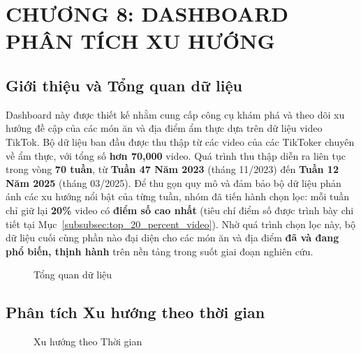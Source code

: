 \section{CHƯƠNG 8: DASHBOARD PHÂN TÍCH XU HƯỚNG}

\subsection{Giới thiệu và Tổng quan dữ liệu}

Dashboard này được thiết kế nhằm cung cấp công cụ khám phá và theo dõi xu hướng đề cập của các món ăn và địa điểm ẩm thực dựa trên dữ liệu video TikTok. Bộ dữ liệu ban đầu được thu thập từ các video của các TikToker chuyên về ẩm thực, với tổng số \textbf{hơn 70,000} video. Quá trình thu thập diễn ra liên tục trong vòng \textbf{70 tuần}, từ \textbf{Tuần 47 Năm 2023} (tháng 11/2023) đến \textbf{Tuần 12 Năm 2025} (tháng 03/2025). Để thu gọn quy mô và đảm bảo bộ dữ liệu phản ánh các xu hướng nổi bật của từng tuần, nhóm đã tiến hành chọn lọc: mỗi tuần chỉ giữ lại \textbf{20\%} video có \textbf{điểm số cao nhất} (tiêu chí điểm số được trình bày chi tiết tại Mục~\ref{subsubsec:top_20_percent_video}). Nhờ quá trình chọn lọc này, bộ dữ liệu cuối cùng phần nào đại diện cho các món ăn và địa điểm \textbf{đã và đang phổ biến, thịnh hành} trên nền tảng trong suốt giai đoạn nghiên cứu.

\begin{figure}[H]
    \centering
    \caption{Tổng quan dữ liệu}
    \label{fig:tong_quan_du_lieu}
\end{figure}

\subsection{Phân tích Xu hướng theo thời gian}

\begin{figure}[H]
    \centering
    \caption{Xu hướng theo Thời gian}
    \label{fig:xu_huong_thoi_gian}
\end{figure}

